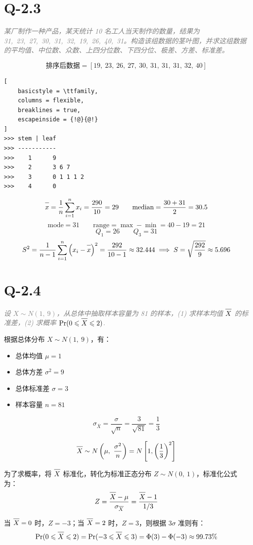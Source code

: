 \documentclass{article}
\newcommand{\barline}[1]{\overline{#1\rule{0pt}{1.9ex}}}
\begin{document}
\section{Q-2.3}
\textit{\textcolor{gray}{某厂制作一种产品，某天统计 10 名工人当天制作的数量，结果为 31,\ 23,\ 27,\ 30,\ 31,\ 32,\ 19,\ 26,\ 40,\ 31。构造该组数据的茎叶图，并求这组数据的平均值、中位数、众数、上四分位数、下四分位、极差、方差、标准差。}}

\[ \text{排序后数据}=[19,\ 23,\ 26,\ 27,\ 30,\ 31,\ 31,\ 31,\ 32,\ 40] \]

\begingroup
\linespread{1}\selectfont
\begin{lstlisting}[
    basicstyle = \ttfamily,
    columns = flexible,
    breaklines = true,
    escapeinside = {!@}{@!}
]
>>> stem | leaf
>>> -----------
>>>    1      9
>>>    2      3 6 7
>>>    3      0 1 1 1 2
>>>    4      0
\end{lstlisting}
\endgroup

\[ \barline{x}=\dfrac{1}{n}\sum_{i=1}^{n}x_i=\dfrac{290}{10}=29\qquad\text{median}=\dfrac{30+31}{2}=30.5 \]
\[ \text{mode}=31\qquad\text{range}=\max-\min=40-19=21 \]
\[ Q_1=26\qquad Q_3=31 \]
\[ S^2=\dfrac{1}{n-1}\sum_{i=1}^{n}\left(x_i-\barline{x}\right)^2=\dfrac{292}{10-1}\approx32.444\implies S=\sqrt{\dfrac{292}{9}}\approx5.696 \]



\section{Q-2.4}
\textit{\textcolor{gray}{设 $X\sim N(1,\ 9)$，从总体中抽取样本容量为 81 的样本，(1) 求样本均值 $\barline{X}$ 的标准差，(2) 求概率 $\Pr(0\leqslant\barline{X}\leqslant2)$.}}

根据总体分布 $X\sim N(1,\ 9)$，有：

\begin{itemize}
    \item 总体均值 $\mu=1$
    \item 总体方差 $\sigma^2=9$
    \item 总体标准差 $\sigma=3$
    \item 样本容量 $n=81$
\end{itemize}
\[ \sigma_{\overline{X}}=\dfrac{\sigma}{\sqrt{n}}=\dfrac{3}{\sqrt{81}}=\dfrac{1}{3} \]

\[ \barline{X}\sim N\left(\mu,\ \dfrac{\sigma^2}{n}\right)=N\left[1, \left(\dfrac{1}{3}\right)^2\right] \]

为了求概率，将 $\barline{X}$ 标准化，转化为标准正态分布 $Z\sim N(0,\ 1)$，标准化公式为：
\[ Z=\dfrac{\barline{X}-\mu}{\sigma_{\overline{X}}}=\dfrac{\barline{X}-1}{1/3} \]

当 $\barline{X}=0$ 时，$Z=-3$；当 $\barline{X}=2$ 时，$Z=3$，则根据 $3\sigma$ 准则有：
\[ \Pr(0\leqslant\barline{X}\leqslant2)=\Pr(-3\leqslant\barline{X}\leqslant3)=\Phi(3)-\Phi(-3)\approx99.73\% \]
\end{document}
